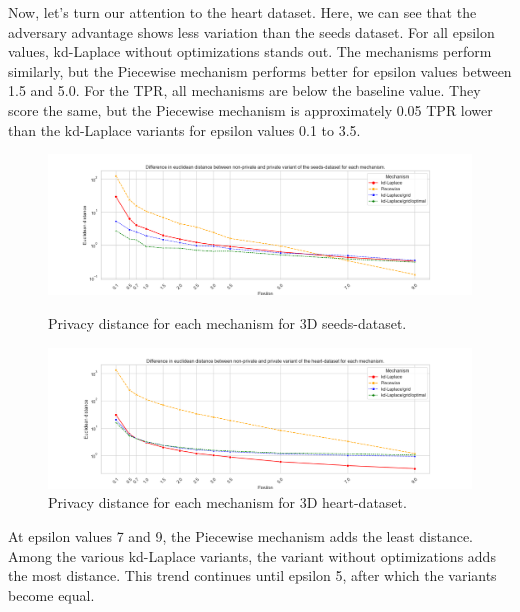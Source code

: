 Now, let's turn our attention to the heart dataset. Here, we can see that the adversary advantage shows less variation than the seeds dataset. For all epsilon values, kd-Laplace without optimizations stands out. The mechanisms perform similarly, but the Piecewise mechanism performs better for epsilon values between 1.5 and 5.0.
For the TPR, all mechanisms are below the baseline value. They score the same, but the Piecewise mechanism is approximately 0.05 TPR lower than the kd-Laplace variants for epsilon values 0.1 to 3.5.
\newpage
\begin{figure}[H]
    \centering
    \begin{minipage}[c]{0.70\textwidth}
        \includegraphics[width=1\textwidth]{Results/RQ2/seeds-dataset/privacy_distance_plot.png}
        \caption{Privacy distance for each mechanism for 3D seeds-dataset.}
        \label{fig:privacy_seeds-dataset_comparison_3d_privacy_distance_plot}
    \end{minipage}
    \begin{minipage}[c]{0.70\textwidth}
        \includegraphics[width=1\textwidth]{Results/RQ2/heart-dataset/privacy_distance_plot.png}
        \caption{Privacy distance for each mechanism for 3D heart-dataset.}
        \label{fig:privacy_heart-dataset_comparison_3d_privacy_distance_plot}
    \end{minipage}
\end{figure}
At epsilon values 7 and 9, the Piecewise mechanism adds the least distance. Among the various kd-Laplace variants, the variant without optimizations adds the most distance.
This trend continues until epsilon 5, after which the variants become equal.


